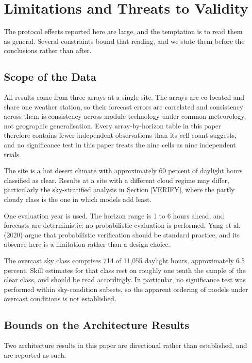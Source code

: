 \section{Limitations and Threats to Validity}

The protocol effects reported here are large, and the temptation is to
read them as general. Several constraints bound that reading, and we
state them before the conclusions rather than after.

\subsection{Scope of the Data}

All results come from three arrays at a single site. The arrays are
co-located and share one weather station, so their forecast errors are
correlated and consistency across them is consistency across module
technology under common meteorology, not geographic generalisation.
Every array-by-horizon table in this paper therefore contains fewer
independent observations than its cell count suggests, and no
significance test in this paper treats the nine cells as nine
independent trials.

The site is a hot desert climate with approximately 60 percent of
daylight hours classified as clear. Results at a site with a different
cloud regime may differ, particularly the sky-stratified analysis in
Section [VERIFY], where the partly cloudy class is the one in which
models add least.

One evaluation year is used. The horizon range is 1 to 6 hours ahead,
and forecasts are deterministic; no probabilistic evaluation is
performed. Yang et al. (2020) argue that probabilistic verification should
be standard practice, and its absence here is a limitation rather than a
design choice.

The overcast sky class comprises 714 of 11,055 daylight hours,
approximately 6.5 percent. Skill estimates for that class rest on
roughly one tenth the sample of the clear class, and should be read
accordingly. In particular, no significance test was performed within
sky-condition subsets, so the apparent ordering of models under overcast
conditions is not established.

\subsection{Bounds on the Architecture Results}

Two architecture results in this paper are directional rather than
established, and are reported as such.

